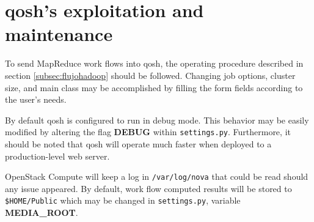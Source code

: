 \section{qosh's exploitation and maintenance}\label{sec:explotacionqosh}
\noindent To send MapReduce work flows into qosh, the operating procedure described in section \ref{subsec:flujohadoop} should be followed. Changing job options, cluster size, and main class may be accomplished by filling the form fields according to the user's needs.

By default qosh is configured to run in debug mode. This behavior may be easily modified by altering the flag \textbf{DEBUG} within \texttt{settings.py}. Furthermore, it should be noted that qosh will operate much faster when deployed to a production-level web server.

OpenStack Compute will keep a log in \texttt{/var/log/nova} that could be read should any issue appeared. By default, work flow computed results will be stored to \texttt{\$HOME/Public} which may be changed in \texttt{settings.py}, variable \textbf{MEDIA\_ROOT}.
